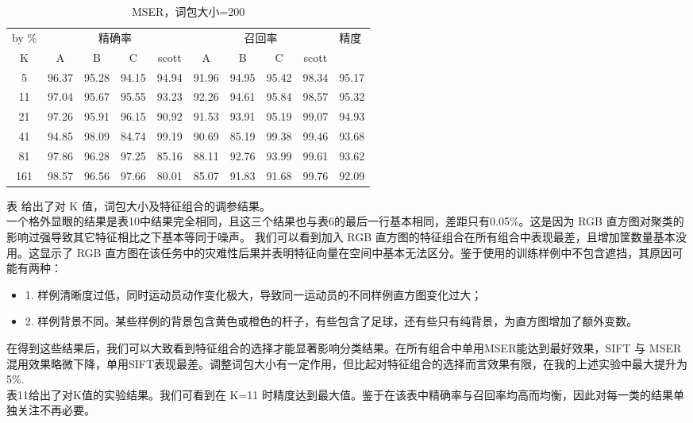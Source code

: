 \documentclass{article}
\begin{document}
\begin{table}[]
\begin{tabular}{|c|c|c|c|c|c|c|c|c|c|}
\hline
\multicolumn{1}{|l|}{by \%} & \multicolumn{4}{c|}{精确率} & \multicolumn{4}{c|}{召回率} & \multicolumn{1}{l|}{\multirow{2}{*}{精度}} \\ \cline{1-9}
K & A & B & C & scott & A & B & C & scott & \multicolumn{1}{l|}{} \\ \hline
5 & 96.37 & 95.28 & 94.15 & 94.94 & 91.96 & 94.95 & 95.42 & 98.34 & 95.17 \\ \hline
11 & 97.04 & 95.67 & 95.55 & 93.23 & 92.26 & 94.61 & 95.84 & 98.57 & 95.32 \\ \hline
21 & 97.26 & 95.91 & 96.15 & 90.92 & 91.53 & 93.91 & 95.19 & 99.07 & 94.93 \\ \hline
41 & 94.85 & 98.09 & 84.74 & 99.19 & 90.69 & 85.19 & 99.38 & 99.46 & 93.68 \\ \hline
81 & 97.86 & 96.28 & 97.25 & 85.16 & 88.11 & 92.76 & 93.99 & 99.61 & 93.62 \\ \hline
161 & 98.57 & 96.56 & 97.66 & 80.01 & 85.07 & 91.83 & 91.68 & 99.76 & 92.09 \\ \hline
\end{tabular}
\caption{MSER，词包大小=200}
\end{table}

表 给出了对 K 值，词包大小及特征组合的调参结果。\\
一个格外显眼的结果是表10中结果完全相同，且这三个结果也与表6的最后一行基本相同，差距只有0.05\%。这是因为 RGB 直方图对聚类的影响过强导致其它特征相比之下基本等同于噪声。
我们可以看到加入 RGB 直方图的特征组合在所有组合中表现最差，且增加筐数量基本没用。这显示了 RGB 直方图在该任务中的灾难性后果并表明特征向量在空间中基本无法区分。鉴于使用的训练样例中不包含遮挡，其原因可能有两种：
\begin{itemize}
\item 1. 样例清晰度过低，同时运动员动作变化极大，导致同一运动员的不同样例直方图变化过大；
\item 2. 样例背景不同。某些样例的背景包含黄色或橙色的杆子，有些包含了足球，还有些只有纯背景，为直方图增加了额外变数。
\end{itemize}
在得到这些结果后，我们可以大致看到特征组合的选择才能显著影响分类结果。在所有组合中单用MSER能达到最好效果，SIFT 与 MSER 混用效果略微下降，单用SIFT表现最差。调整词包大小有一定作用，但比起对特征组合的选择而言效果有限，在我的上述实验中最大提升为5\%.\\
表11给出了对K值的实验结果。我们可看到在 K=11 时精度达到最大值。鉴于在该表中精确率与召回率均高而均衡，因此对每一类的结果单独关注不再必要。
\newpage
\end{document}
